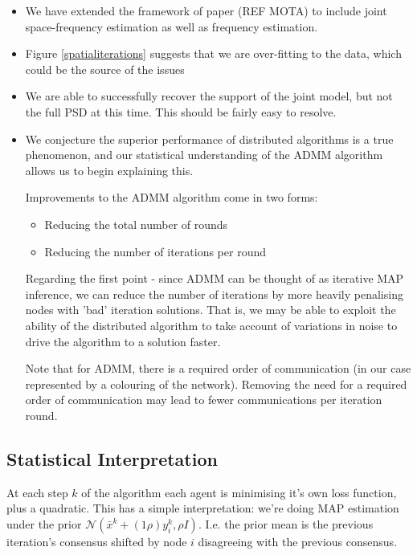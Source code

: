 \documentclass{article}
\begin{document}
\begin{itemize}
\item We have extended the framework of paper (REF MOTA) to include joint space-frequency estimation as well as frequency estimation. 
\item Figure \ref{spatialiterations} suggests that we are over-fitting to the data, which could be the source of the issues 
\item We are able to successfully recover the support of the joint model, but not the full PSD at this time. This should be fairly easy to resolve.
\item We conjecture the superior performance of  distributed algorithms is a true phenomenon, and our statistical understanding of the ADMM algorithm allows us to begin explaining this.

Improvements to the ADMM algorithm come in two forms:

\begin{itemize}
\item Reducing the total number of rounds
\item Reducing the number of iterations per round 
\end{itemize}

Regarding the first point - since ADMM can be thought of as iterative MAP inference, we can reduce the number of iterations by more heavily penalising nodes with 'bad' iteration solutions. That is, we may be able to exploit the ability of the distributed algorithm to take account of variations in noise to drive the algorithm to a solution faster.

Note that for ADMM, there is a required order of communication (in our case represented by a colouring of the network). Removing the need for a required order of communication may lead to fewer communications per iteration round.

\end{itemize}


\appendix

\subsection{Statistical Interpretation}
At each step \(k\) of the algorithm each agent is minimising it's own loss function, plus a quadratic.
This has a simple interpretation: we're doing MAP estimation under the prior \(\mathcal{N}\left(\bar{x}^{k} + \left(1\rho\right)y_i^k, \rho I\right)\). I.e. the prior mean is the previous iteration's consensus shifted by node \(i\) disagreeing with the previous consensus. 
\end{document}
